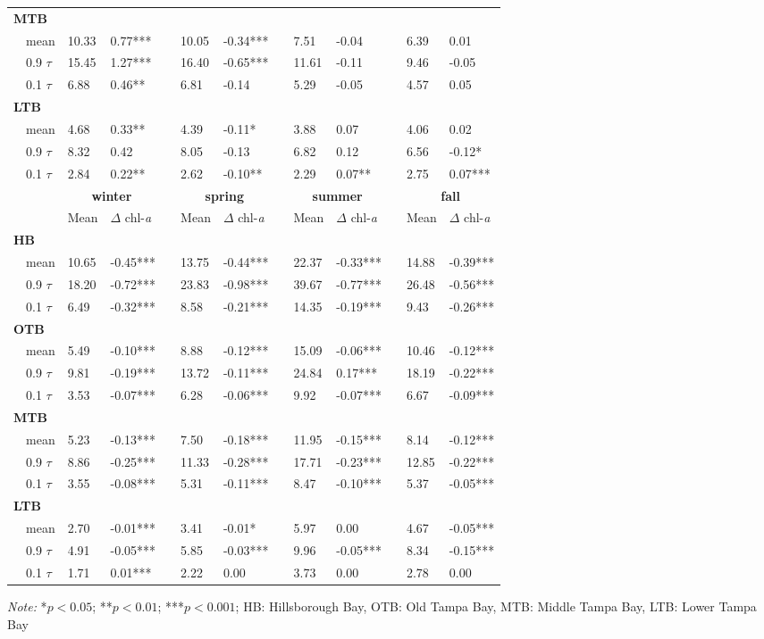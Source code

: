 \documentclass{svjour3}\usepackage[]{graphicx}\usepackage[]{color}
\begin{document}
\begin{table}[!tbp]
\begin{center}
\begin{tabular}{lllcllcllcll}
\hline
{\bfseries MTB}&&&&&&&&&&&\tabularnewline
~~mean&10.33& 0.77***&&10.05&-0.34***&& 7.51&-0.04 && 6.39& 0.01 \tabularnewline
~~0.9 $\tau$&15.45& 1.27***&&16.40&-0.65***&&11.61&-0.11 && 9.46&-0.05 \tabularnewline
~~0.1 $\tau$& 6.88& 0.46**&& 6.81&-0.14 && 5.29&-0.05 && 4.57& 0.05 \tabularnewline
\hline
{\bfseries LTB}&&&&&&&&&&&\tabularnewline
~~mean& 4.68& 0.33**&& 4.39&-0.11*&& 3.88& 0.07 && 4.06& 0.02 \tabularnewline
~~0.9 $\tau$& 8.32& 0.42 && 8.05&-0.13 && 6.82& 0.12 && 6.56&-0.12*\tabularnewline
~~0.1 $\tau$& 2.84& 0.22**&& 2.62&-0.10**&& 2.29& 0.07**&& 2.75& 0.07***\tabularnewline
\hline
\multicolumn{1}{l}{\bfseries }&\multicolumn{2}{c}{\bfseries {\bf winter}}&\multicolumn{1}{c}{\bfseries }&\multicolumn{2}{c}{\bfseries {\bf spring}}&\multicolumn{1}{c}{\bfseries }&\multicolumn{2}{c}{\bfseries {\bf summer}}&\multicolumn{1}{c}{\bfseries }&\multicolumn{2}{c}{\bfseries {\bf fall}}\tabularnewline
\cline{2-3} \cline{5-6} \cline{8-9} \cline{11-12}
~~&Mean&$\Delta$ chl-\textit{a}&&Mean&$\Delta$ chl-\textit{a}&&Mean&$\Delta$ chl-\textit{a}&&Mean&$\Delta$ chl-\textit{a}\tabularnewline
\hline
{\bfseries HB}&&&&&&&&&&&\tabularnewline
~~mean&10.65&-0.45***&&13.75&-0.44***&&22.37&-0.33***&&14.88&-0.39***\tabularnewline
~~0.9 $\tau$&18.20&-0.72***&&23.83&-0.98***&&39.67&-0.77***&&26.48&-0.56***\tabularnewline
~~0.1 $\tau$& 6.49&-0.32***&& 8.58&-0.21***&&14.35&-0.19***&& 9.43&-0.26***\tabularnewline
\hline
{\bfseries OTB}&&&&&&&&&&&\tabularnewline
~~mean& 5.49&-0.10***&& 8.88&-0.12***&&15.09&-0.06***&&10.46&-0.12***\tabularnewline
~~0.9 $\tau$& 9.81&-0.19***&&13.72&-0.11***&&24.84& 0.17***&&18.19&-0.22***\tabularnewline
~~0.1 $\tau$& 3.53&-0.07***&& 6.28&-0.06***&& 9.92&-0.07***&& 6.67&-0.09***\tabularnewline
\hline
{\bfseries MTB}&&&&&&&&&&&\tabularnewline
~~mean& 5.23&-0.13***&& 7.50&-0.18***&&11.95&-0.15***&& 8.14&-0.12***\tabularnewline
~~0.9 $\tau$& 8.86&-0.25***&&11.33&-0.28***&&17.71&-0.23***&&12.85&-0.22***\tabularnewline
~~0.1 $\tau$& 3.55&-0.08***&& 5.31&-0.11***&& 8.47&-0.10***&& 5.37&-0.05***\tabularnewline
\hline
{\bfseries LTB}&&&&&&&&&&&\tabularnewline
~~mean& 2.70&-0.01***&& 3.41&-0.01*&& 5.97& 0.00 && 4.67&-0.05***\tabularnewline
~~0.9 $\tau$& 4.91&-0.05***&& 5.85&-0.03***&& 9.96&-0.05***&& 8.34&-0.15***\tabularnewline
~~0.1 $\tau$& 1.71& 0.01***&& 2.22& 0.00 && 3.73& 0.00 && 2.78& 0.00 \tabularnewline
\hline
\end{tabular}
\end{center}
\footnotesize \textit{Note:} *$p<0.05$; **$p<0.01$; ***$p<0.001$; HB: Hillsborough Bay, OTB: Old Tampa Bay, MTB: Middle Tampa Bay, LTB: Lower Tampa Bay\end{table}
\end{document}
